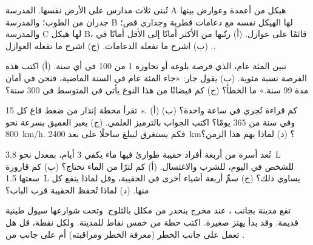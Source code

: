 \begin{exercise}[$\star\star$]\label{exo:g9:natural-risks:8}
تُبنى ثلاث مدارس على الأرض نفسها. المدرسة A هيكل من أعمدة وعوارض بينها جدران من
الطوب؛ والمدرسة B لها الهيكل نفسه مع دعامات قطرية وجداري قص؛ والمدرسة C لها هيكل
B، قائمًا على عوازل. (أ) رتّبها من الأكثر أمانًا إلى الأقل أمانًا في .
(ب) اشرح ما تفعله الدعامات. (ج) اشرح ما تفعله
العوازل.
\end{exercise}

\begin{exercise}[$\star\star$]\label{exo:g9:natural-risks:9}
تبين    المئة عام، الذي فرصة بلوغه أو تجاوزه 1 من 100 في أي سنة.
(أ) اكتب هذه الفرصة نسبة مئوية. (ب) يقول جار: «جاء  المئة عام في السنة
الماضية، فنحن في أمان مدة 99 سنة.» ما الخطأ؟ (ج) كم فيضانًا من هذا النوع يأتي
في المتوسط في 300 سنة؟
\end{exercise}

\begin{exercise}[$\star\star$]\label{exo:g9:natural-risks:10}
تقرأ محطة إنذار من  ضغط قاع  كل \qty{15}{s}. (أ) كم قراءة تُجري في
ساعة واحدة؟ (ب) وفي سنة من 365 يومًا؟ اكتب الجواب بالترميز العلمي. (ج) يعبر
  العميق بسرعة نحو \qty{800}{km/h}. فكم يستغرق ليبلغ ساحلًا على بعد
\qty{2400}{km}؟ (د) لماذا يهم هذا الزمن؟
\end{exercise}

\begin{exercise}[$\star\star\star$]\label{exo:g9:natural-risks:11}
تُعد أسرة من أربعة أفراد حقيبة طوارئ فيها ماء يكفي 3 أيام، بمعدل نحو
\qty{3.8}{L} للشخص في اليوم، للشرب والاغتسال. (أ) كم لترًا من الماء تحتاج؟
(ب) كم قارورة سعتها \qty{1.5}{L} يساوي ذلك؟ (ج) سمِّ أربعة أشياء أخرى في الحقيبة،
وقل لماذا ينفع كل منها. (د) لماذا تُحفظ الحقيبة قرب الباب؟
\end{exercise}

\begin{exercise}[$\star\star\star$]\label{exo:g9:natural-risks:12}
تقع مدينة بجانب ، عند مخرج  ينحدر من  مكلل بالثلوج. وتحت شوارعها 
سيول طينية قديمة. وقد بدأ  يهتز  صغيرة. اكتب خطة  من خمس نقاط
للمدينة. ولكل نقطة، قل هل تعمل على جانب الخطر (معرفة الخطر ومراقبته) أم على جانب
 من .
\end{exercise}


